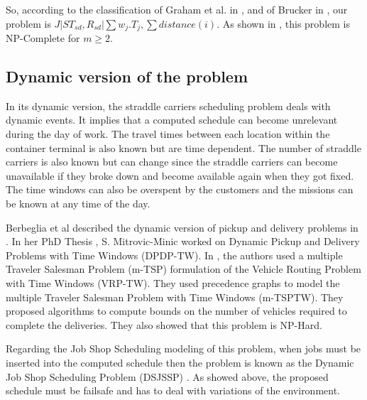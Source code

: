 \documentclass[a4paper,10pt]{article}
\begin{document}

So, according to the classification of Graham et al. in \cite{Graham1979}, and of Brucker in \cite{Brucker2010}, our problem is ${ J|ST_{sd}, R_{sd}|\sum w_j.T_{j} , \sum distance(i)}$. As shown in \cite{Garey1976}, this problem is NP-Complete for $m\geq2$.


    \subsection{Dynamic version of the problem}

In its dynamic version, the straddle carriers scheduling problem deals with dynamic events. It implies that a computed schedule can become unrelevant during the day of work. The travel times between each location within the container terminal is also known but are time dependent. The number of straddle carriers is also known but can change since the straddle carriers can become unavailable if they broke down and become available again when they got fixed. The time windows can also be overspent by the customers and the missions can be known at any time of the day.

Berbeglia et al described the dynamic version of pickup and delivery problems in \cite{Berbeglia2010}. In her PhD Thesis \cite{Mitrovic2001}, S. Mitrovic-Minic worked on Dynamic Pickup and Delivery Problems with Time Windows (DPDP-TW). In \cite{Mitrovic2006}, the authors used a multiple Traveler Salesman Problem (m-TSP) formulation of the Vehicle Routing Problem with Time Windows (VRP-TW). They used precedence graphs to model the multiple Traveler Salesman Problem with Time Windows (m-TSPTW). They proposed algorithms to compute bounds on the number of vehicles required to complete the deliveries. They also showed that this problem is NP-Hard.

Regarding the Job Shop Scheduling modeling of this problem, when jobs must be inserted into the computed schedule then the problem is known as the Dynamic Job Shop Scheduling Problem (DSJSSP) \cite{Ramasesh1990}. %
As showed above, the proposed schedule must be failsafe and has to deal with variations of the environment. 
\end{document}
